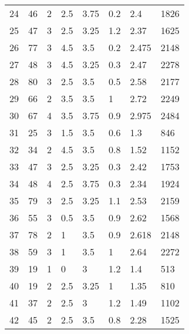 \begin{table*}[h!]
\begin{tabular*}{\linewidth}{p{40pt}<{\centering}p{30pt}<{\centering}
    p{30pt}<{\centering}p{40pt}<{\centering}p{50pt}<{\centering}p{70pt}<{\centering}
    p{60pt}<{\centering}p{50pt}<{\centering}}
    24 & 46 & 2 & 2.5 & 3.75 & 0.2 & 2.4 & 1826 \\
    25 & 47 & 3 & 2.5 & 3.25 & 1.2 & 2.37 & 1625 \\
    26 & 77 & 3 & 4.5 & 3.5 & 0.2 & 2.475 & 2148 \\
    27 & 48 & 3 & 4.5 & 3.25 & 0.3 & 2.47 & 2278 \\
    28 & 80 & 3 & 2.5 & 3.5 & 0.5 & 2.58 & 2177 \\
    29 & 66 & 2 & 3.5 & 3.5 & 1 & 2.72 & 2249 \\
    30 & 67 & 4 & 3.5 & 3.75 & 0.9 & 2.975 & 2484 \\
    31 & 25 & 3 & 1.5 & 3.5 & 0.6 & 1.3 & 846 \\
    32 & 34 & 2 & 4.5 & 3.5 & 0.8 & 1.52 & 1152 \\
    33 & 47 & 3 & 2.5 & 3.25 & 0.3 & 2.42 & 1753 \\
    34 & 48 & 4 & 2.5 & 3.75 & 0.3 & 2.34 & 1924 \\
    35 & 79 & 3 & 2.5 & 3.25 & 1.1 & 2.53 & 2159 \\
    36 & 55 & 3 & 0.5 & 3.5 & 0.9 & 2.62 & 1568 \\
    37 & 78 & 2 & 1 & 3.5 & 0.9 & 2.618 & 2148 \\
    38 & 59 & 3 & 1 & 3.5 & 1 & 2.64 & 2272 \\
    39 & 19 & 1 & 0 & 3 & 1.2 & 1.4 & 513 \\
    40 & 19 & 2 & 2.5 & 3.25 & 1 & 1.35 & 810 \\
    41 & 37 & 2 & 2.5 & 3 & 1.2 & 1.49 & 1102 \\
    42 & 45 & 2 & 2.5 & 3.5 & 0.8 & 2.28 & 1525 \\
    \bottomrule
  \end{tabular*}
  \label{Ap1}
\end{table*}

\newpage

